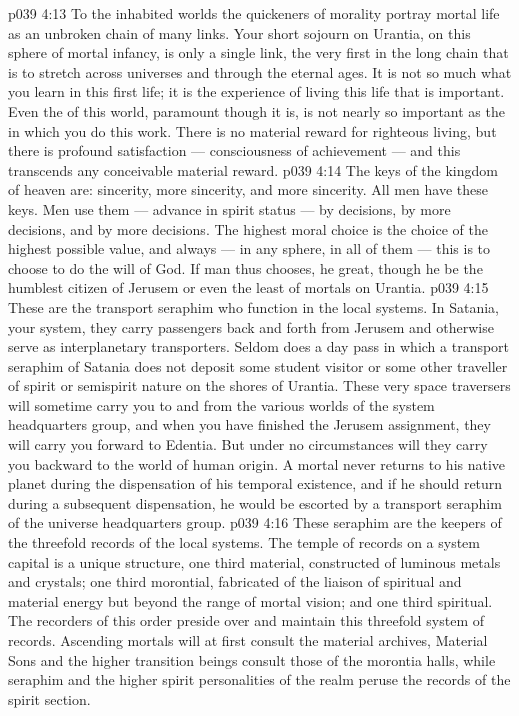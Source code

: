 \vs p039 4:13 To the inhabited worlds the quickeners of morality portray mortal life as an unbroken chain of many links. Your short sojourn on Urantia, on this sphere of mortal infancy, is only a single link, the very first in the long chain that is to stretch across universes and through the eternal ages. It is not so much what you learn in this first life; it is the experience of living this life that is important. Even the  of this world, paramount though it is, is not nearly so important as the  in which you do this work. There is no material reward for righteous living, but there is profound satisfaction --- consciousness of achievement --- and this transcends any conceivable material reward.
\vs p039 4:14 The keys of the kingdom of heaven are: sincerity, more sincerity, and more sincerity. All men have these keys. Men use them --- advance in spirit status --- by decisions, by more decisions, and by more decisions. The highest moral choice is the choice of the highest possible value, and always --- in any sphere, in all of them --- this is to choose to do the will of God. If man thus chooses, he  great, though he be the humblest citizen of Jerusem or even the least of mortals on Urantia.
\vs p039 4:15 \bibnobreakspace {} These are the transport seraphim who function in the local systems. In Satania, your system, they carry passengers back and forth from Jerusem and otherwise serve as interplanetary transporters. Seldom does a day pass in which a transport seraphim of Satania does not deposit some student visitor or some other traveller of spirit or semispirit nature on the shores of Urantia. These very space traversers will sometime carry you to and from the various worlds of the system headquarters group, and when you have finished the Jerusem assignment, they will carry you forward to Edentia. But under no circumstances will they carry you backward to the world of human origin. A mortal never returns to his native planet during the dispensation of his temporal existence, and if he should return during a subsequent dispensation, he would be escorted by a transport seraphim of the universe headquarters group.
\vs p039 4:16 \bibnobreakspace {} These seraphim are the keepers of the threefold records of the local systems. The temple of records on a system capital is a unique structure, one third material, constructed of luminous metals and crystals; one third morontial, fabricated of the liaison of spiritual and material energy but beyond the range of mortal vision; and one third spiritual. The recorders of this order preside over and maintain this threefold system of records. Ascending mortals will at first consult the material archives, Material Sons and the higher transition beings consult those of the morontia halls, while seraphim and the higher spirit personalities of the realm peruse the records of the spirit section.
